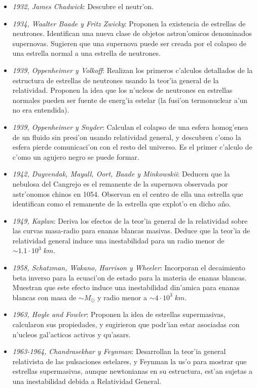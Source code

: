 \begin{itemize}
\item \emph{1932, James Chadwick}: Descubre el neutr'on.
\item \emph{1934, Waalter Baade y Fritz Zwicky}: Proponen la existencia de estrellas de neutrones. Identifican una nueva clase de objetos astron'omicos denominados supernovas. Sugieren que una supernova puede ser creada por el colapso de una estrella normal a una estrella de neutrones.
\item \emph{1939, Oppenheimer y Volkoff}: Realizan los primeros c'alculos detallados de la estructura de estrellas de neutrones usando la teor'ia general de la relatividad. Proponen la idea que los n'ucleos de neutrones en estrellas normales pueden ser fuente de energ'ia estelar (la fusi'on termonuclear a'un no era entendida).
\item \emph{1939, Oppenheimer y Snyder}: Calculan el colapso de una esfera homog'enea de un fluido sin presi'on usando relatividad general, y descubren c'omo la esfera pierde comunicaci'on con el resto del universo. Es el primer c'alculo de c'omo un agujero negro se puede formar.
\item \emph{1942, Duyvendak, Mayall, Oort, Baade y Minkowskii}: Deducen que la nebulosa del Cangrejo es el remanente de la supernova observada por astr'onomos chinos en 1054. Observan en el centro de ella una estrella que identifican como el remanente de la estrella que explot'o en dicho a\~no.
\item \emph{1949, Kaplan}: Deriva los efectos de la teor'ia general de la relatividad sobre las curvas masa-radio para enanas blancas masivas. Deduce que la teor'ia de relatividad general induce una inestabilidad para un radio menor de $\sim1.1\cdot10^{3}\;km$.
\item \emph{1958, Schatzman, Wakano, Harrison y Wheeler}: Incorporan el decaimiento beta inverso para la ecuaci'on de estado para la materia de enanas blancas. Muestran que este efecto induce una inestabilidad din'amica para enanas blancas con masa de $\sim M_{\odot}$ y radio menor a $\sim4\cdot10^{3}\;km$.
\item \emph{1963, Hoyle and Fowler}: Proponen la idea de estrellas supermasivas, calcularon sus propiedades, y sugirieron que podr'ian estar asociadas con n'ucleos gal'acticos activos y qu'asars.
\item \emph{1963-1964, Chandrasekhar y Feynman}: Desarrollan la teor'ia general relativista de las pulsaciones estelares, y Feynman la us'o para mostrar que estrellas supermasivas, aunque newtonianas en su estructura, est'an sujetas a una inestabilidad debida a Relatividad General.

\end{itemize}
